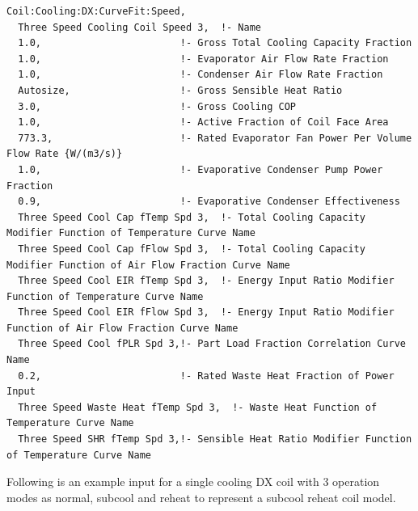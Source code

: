 \begin{lstlisting}
Coil:Cooling:DX:CurveFit:Speed,
  Three Speed Cooling Coil Speed 3,  !- Name
  1.0,                        !- Gross Total Cooling Capacity Fraction
  1.0,                        !- Evaporator Air Flow Rate Fraction
  1.0,                        !- Condenser Air Flow Rate Fraction
  Autosize,                   !- Gross Sensible Heat Ratio
  3.0,                        !- Gross Cooling COP
  1.0,                        !- Active Fraction of Coil Face Area
  773.3,                      !- Rated Evaporator Fan Power Per Volume Flow Rate {W/(m3/s)}
  1.0,                        !- Evaporative Condenser Pump Power Fraction
  0.9,                        !- Evaporative Condenser Effectiveness
  Three Speed Cool Cap fTemp Spd 3,  !- Total Cooling Capacity Modifier Function of Temperature Curve Name
  Three Speed Cool Cap fFlow Spd 3,  !- Total Cooling Capacity Modifier Function of Air Flow Fraction Curve Name
  Three Speed Cool EIR fTemp Spd 3,  !- Energy Input Ratio Modifier Function of Temperature Curve Name
  Three Speed Cool EIR fFlow Spd 3,  !- Energy Input Ratio Modifier Function of Air Flow Fraction Curve Name
  Three Speed Cool fPLR Spd 3,!- Part Load Fraction Correlation Curve Name
  0.2,                        !- Rated Waste Heat Fraction of Power Input
  Three Speed Waste Heat fTemp Spd 3,  !- Waste Heat Function of Temperature Curve Name
  Three Speed SHR fTemp Spd 3,!- Sensible Heat Ratio Modifier Function of Temperature Curve Name
\end{lstlisting}

Following is an example input for a single cooling DX coil with 3 operation modes as normal, subcool and reheat to represent a subcool reheat coil model.

